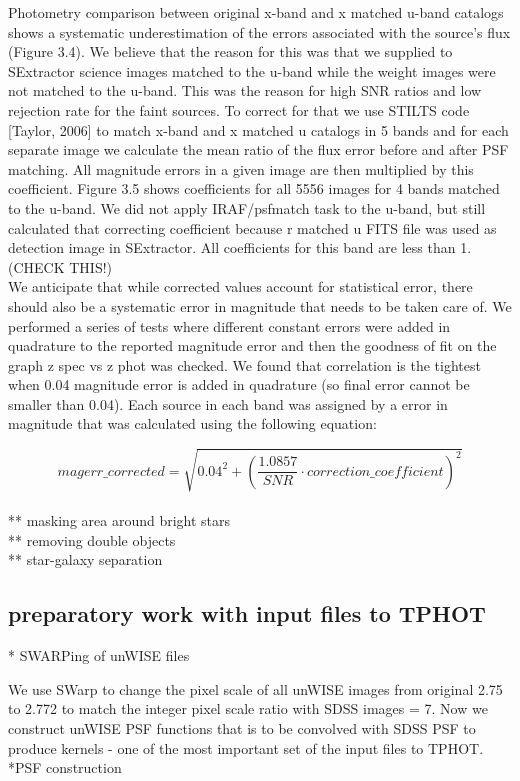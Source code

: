 \documentclass[numberedappendix,apj,twocolumn]{emulateapj}
\begin{document}
Photometry comparison between original x-band and x matched u-band catalogs
shows a systematic underestimation of the errors associated with the source's flux
(Figure 3.4). We believe that the reason for this was that we supplied to SExtractor science images matched to the u-band while the weight images were not matched to the u-band. This was the reason for high SNR ratios and low rejection rate for the faint sources.
To correct for that we use STILTS code [Taylor, 2006] to match x-band
and x matched u catalogs in 5 bands and for each separate image we calculate the
mean ratio of the flux error before and after PSF matching. All magnitude errors in a given
image are then multiplied by this coefficient. Figure 3.5 shows coefficients for all 5556 images for 4 bands matched to the u-band. We did not apply IRAF/psfmatch task to the u-band, but still calculated that correcting coefficient because r matched u FITS file was used as detection image in SExtractor. All
coefficients for this band are less than 1. (CHECK THIS!)
\\
We anticipate that while corrected values account for statistical error, there should
also be a systematic error in magnitude that needs to be taken care of. We performed
a series of tests where different constant errors were added in quadrature to the
reported magnitude error and then the goodness of fit on the graph z spec vs z phot
was checked. We found that correlation is the tightest when 0.04 magnitude error
is added in quadrature (so final error cannot be smaller than 0.04). Each
source in each band was assigned by a error in magnitude that was calculated using the following equation:

$$ magerr\_corrected = \sqrt{0.04^{2}+(\dfrac{1.0857}{SNR}\cdot correction\_coefficient)^{2}}$$
\\
** masking area around bright stars\\
** removing double objects\\
** star-galaxy separation

\subsection{preparatory work with input files to TPHOT} 
	* SWARPing of unWISE files
	
We use SWarp to change the pixel scale of all unWISE images from original 2.75 to 2.772 to match the integer pixel scale ratio with SDSS images = 7. Now we construct unWISE PSF functions that is to be convolved with SDSS PSF to produce kernels - one of the most important set of the input files to TPHOT.	
*PSF construction
\end{document}
